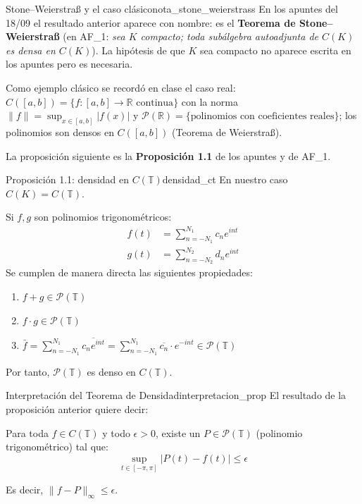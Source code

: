 \begin{nota}{Stone--Weierstraß y el caso clásico}{nota_stone_weierstrass}
En los apuntes del 18/09 el resultado anterior aparece con nombre: es el \textbf{Teorema de Stone--Weierstraß} (en AF\_1: \emph{sea $K$ compacto; toda subálgebra autoadjunta de $C(K)$ es densa en $C(K)$}). La hipótesis de que $K$ sea compacto no aparece escrita en los apuntes pero es necesaria.

Como ejemplo clásico se recordó en clase el caso real: $C([a,b]) = \{f : [a,b] \to \mathbb{R} \text{ continua}\}$ con la norma $\|f\| = \sup_{x \in [a,b]} |f(x)|$ y $\mathcal{P}(\mathbb{R}) = \{\text{polinomios con coeficientes reales}\}$; los polinomios son densos en $C([a,b])$ (Teorema de Weierstraß).

La proposición siguiente es la \textbf{Proposición 1.1} de los apuntes y de AF\_1.
\end{nota}

\begin{proposicion}{Proposición 1.1: densidad en $C(\mathbb{T})$}{densidad_ct}
En nuestro caso $C(K) = C(\mathbb{T})$.

Si $f, g$ son polinomios trigonométricos:
\begin{align*}
    f(t) &= \sum_{n=-N_1}^{N_1} c_n e^{int} \\
    g(t) &= \sum_{n=-N_2}^{N_2} d_n e^{int}
\end{align*}
Se cumplen de manera directa las siguientes propiedades:
\begin{enumerate}
    \item $f + g \in \mathcal{P}(\mathbb{T})$
    \item $f \cdot g \in \mathcal{P}(\mathbb{T})$
    \item $\bar{f} = \sum_{n=-N_1}^{N_1} \overline{c_n e^{int}} = \sum_{n=-N_1}^{N_1} \overline{c_n} \cdot e^{-int} \in \mathcal{P}(\mathbb{T})$
\end{enumerate}
Por tanto, $\mathcal{P}(\mathbb{T})$ es denso en $C(\mathbb{T})$.
\end{proposicion}

\begin{nota}{Interpretación del Teorema de Densidad}{interpretacion_prop}
El resultado de la proposición anterior quiere decir:

Para toda $f \in C(\mathbb{T})$ y todo $\epsilon > 0$, existe un $P \in \mathcal{P}(\mathbb{T})$ (polinomio trigonométrico) tal que:
\begin{equation*}
    \sup_{t \in [-\pi, \pi]} |P(t) - f(t)| \le \epsilon
\end{equation*}


Es decir, $\|f - P\|_\infty \le \epsilon$.
\end{nota}

